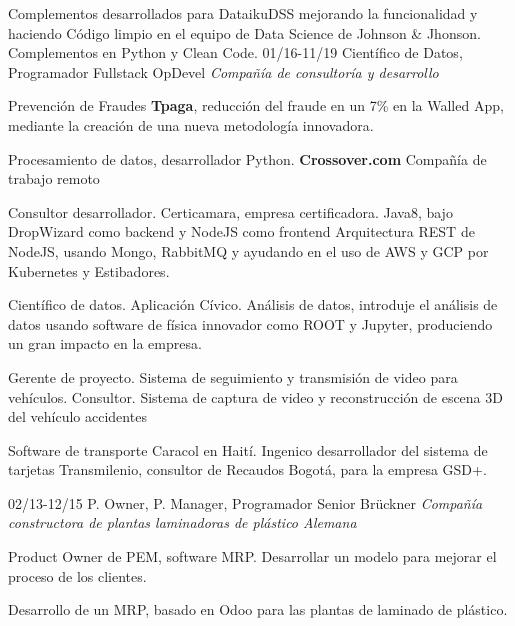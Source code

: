 \begin{entrylist}
{Complementos desarrollados para DataikuDSS mejorando la funcionalidad y haciendo
Código limpio en el equipo de Data Science de Johnson \& Jhonson. Complementos en Python y Clean Code.}
  \entry
    {01/16-11/19}
    {Científico de Datos, Programador Fullstack}
    {OpDevel {\sl Compañía de consultoría y desarrollo}}
    {Prevención de Fraudes \textbf{Tpaga}, reducción del fraude en un 7\% en la Walled App, mediante la
creación de una nueva metodología innovadora.

Procesamiento de datos, desarrollador Python. \textbf{Crossover.com} Compañía de trabajo remoto

Consultor desarrollador. Certicamara, empresa certificadora. Java8, bajo
DropWizard como backend y NodeJS como frontend Arquitectura REST de NodeJS,
usando Mongo, RabbitMQ y ayudando en el uso de AWS y GCP por Kubernetes
y Estibadores.

Científico de datos. Aplicación Cívico. Análisis de datos, introduje el análisis de datos usando
software de física innovador como ROOT y Jupyter, produciendo un gran impacto en
la empresa.

Gerente de proyecto. Sistema de seguimiento y transmisión de video para vehículos.
Consultor. Sistema de captura de video y reconstrucción de escena 3D del vehículo
accidentes


Software de transporte Caracol en Haití. Ingenico desarrollador del sistema de tarjetas Transmilenio,
consultor de Recaudos Bogotá, para la empresa GSD+.}
  \entry
	{02/13-12/15}
	{P. Owner, P. Manager, Programador Senior}
	{Brückner {\sl Compañía constructora de plantas laminadoras de plástico Alemana}}
	{Product Owner de PEM, software MRP. Desarrollar un modelo para mejorar el proceso de los clientes.

	Desarrollo de un MRP, basado en Odoo para las plantas de laminado de plástico.}

\end{entrylist}
\newpage
%

